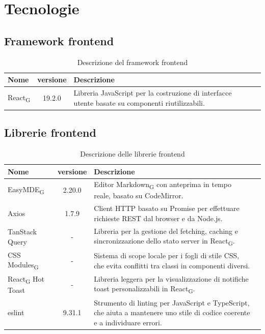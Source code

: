 \documentclass[11pt,a4paper]{article}
\newcommand{\gls}[1]{#1\textsubscript{G}}
\begin{document}
\section{Tecnologie}
\subsection{Framework frontend}
\begin{table}[H]
    \centering
    \begin{tabular}{|l|c|>{\raggedright\arraybackslash}p{}|p{}|}
        \hline
        \textbf{Nome} & \textbf{versione} & \textbf{Descrizione} \\
        \hline
        \gls{React} & 19.2.0 & Libreria JavaScript per la costruzione di interfacce utente basate su componenti riutilizzabili. \\
        \hline
    \end{tabular}
    \caption{Descrizione del framework frontend}
    \label{tab:framework_frontend}
\end{table}
\subsection{Librerie frontend}
    \begin{table}[H]
        \centering
        \begin{tabular}{|l|c|>{\raggedright\arraybackslash}p{}|p{}|}
            \hline
            \textbf{Nome} & \textbf{versione} & \textbf{Descrizione} \\
            \hline
            \gls{EasyMDE} & 2.20.0 & Editor \gls{Markdown} con anteprima in tempo reale, basato su CodeMirror. \\
            \hline
            Axios & 1.7.9 & Client HTTP basato su Promise per effettuare richieste REST dal browser e da Node.js. \\
            \hline
            TanStack Query & - & Libreria per la gestione del fetching, caching e sincronizzazione dello stato server in \gls{React}. \\
            \hline
            \gls{CSS Modules} & - & Sistema di scope locale per i fogli di stile CSS, che evita conflitti tra classi in componenti diversi. \\
            \hline
            \gls{React} Hot Toast & - & Libreria leggera per la visualizzazione di notifiche toast personalizzabili in \gls{React}. \\
            \hline
            eslint & 9.31.1 & Strumento di linting per JavaScript e TypeScript, che aiuta a mantenere uno stile di codice coerente e a individuare errori. \\
            \hline
        \end{tabular}
        \caption{Descrizione delle librerie frontend}
        \label{tab:librerie_frontend}
    \end{table}
\end{document}
